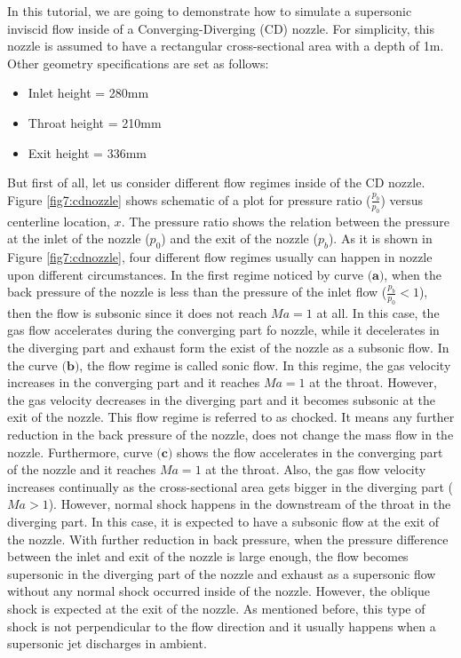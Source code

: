 In this tutorial, we are going to demonstrate how to simulate a supersonic inviscid flow inside of a Converging-Diverging (CD) nozzle. For simplicity, this nozzle is assumed to have a rectangular cross-sectional area with a depth of 1m. Other geometry specifications are set as follows: 
\begin{itemize}
	\item Inlet height = 280mm
	\item Throat height = 210mm 
	\item Exit height = 336mm
\end{itemize}
But first of all, let us consider different flow regimes inside of the CD nozzle. Figure \ref{fig7:cdnozzle} shows schematic of a plot for pressure ratio ($\frac{p_{b}}{p_{0}}$) versus centerline location, $x$. The pressure ratio shows the relation between the pressure at the inlet of the nozzle ($p_{0}$) and the exit of the nozzle ($p_{b}$). As it is shown in Figure \ref{fig7:cdnozzle}, four different flow regimes usually can happen in nozzle upon different circumstances. In the first regime noticed by curve $\textbf{(a)}$, when the back pressure of the nozzle is less than the pressure of the inlet flow ($\frac{p_{b}}{p_{0}}<1$), then the flow is subsonic since it does not reach $Ma=1$ at all. In this case, the gas flow accelerates during the converging part fo nozzle, while it decelerates in the diverging part and exhaust form the exist of the nozzle as a subsonic flow. In the curve $\textbf{(b)}$, the flow regime is called sonic flow. In this regime, the gas velocity increases in the converging part and it reaches $Ma=1$ at the throat. However, the gas velocity decreases in the diverging part and it becomes subsonic at the exit of the nozzle. This flow regime is referred to as chocked. It means any further reduction in the back pressure of the nozzle, does not change the mass flow in the nozzle. Furthermore, curve $\textbf{(c)}$ shows the flow accelerates in the converging part of the nozzle and it reaches $Ma=1$ at the throat. Also, the gas flow velocity increases continually as the cross-sectional area gets bigger in the diverging part ($Ma>1$). However, normal shock happens in the downstream of the throat in the diverging part. In this case, it is expected to have a subsonic flow at the exit of the nozzle.
With further reduction in back pressure, when the pressure difference between the inlet and exit of the nozzle is large enough, the flow becomes supersonic in the diverging part of the nozzle and exhaust as a supersonic flow without any normal shock occurred inside of the nozzle. However, the oblique shock is expected at the exit of the nozzle. As mentioned before, this type of shock is not perpendicular to the flow direction and it usually happens when a supersonic jet discharges in ambient.

